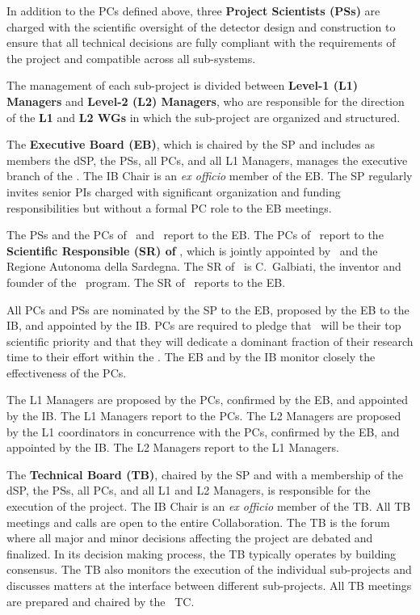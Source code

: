In addition to the PCs defined above, three {\bf Project Scientists (PSs)} are charged with the scientific oversight of the detector design and construction to ensure that all technical decisions are fully compliant with the requirements of the project and compatible across all sub-systems.

The management of each sub-project is divided between {\bf Level-1 (L1) Managers} and {\bf Level-2 (L2) Managers}, who are responsible for the direction of the {\bf L1} and {\bf L2 WGs} in which the sub-project are organized and structured.

The {\bf Executive Board (EB)}, which is chaired by the SP and includes as members the dSP, the PSs, all PCs, and all L1 Managers, manages the executive branch of the \GADMC.  The IB Chair is an {\it ex officio} member of the EB.  The SP regularly invites senior PIs charged with significant organization and funding responsibilities but without a formal PC role to the EB meetings.

The PSs and the PCs of \DSks\ and \Urania\ report to the EB.  The PCs of \Aria\ report to the {\bf Scientific Responsible (SR) of \Aria}, which is jointly appointed by \INFN\ and the Regione Autonoma della Sardegna.  The SR of \Aria\ is C.~Galbiati, the inventor and founder of the \Aria\ program.  The SR of \Aria\ reports to the EB.

All PCs and PSs are nominated by the SP to the EB, proposed by the EB to the IB, and appointed by the IB.  PCs are required to pledge that \DSks\ will be their top scientific priority and that they will dedicate a dominant fraction of their research time to their effort within the \GADMC.  The EB and by the IB monitor closely the effectiveness of the PCs.

The L1 Managers are proposed by the PCs, confirmed by the EB, and appointed by the IB.  The L1 Managers report to the PCs.  The L2 Managers are proposed by the L1 coordinators in concurrence with the PCs, confirmed by the EB, and appointed by the IB.  The L2 Managers report to the L1 Managers.

The {\bf Technical Board (TB)}, chaired by the SP and with a membership of the dSP, the PSs, all PCs, and all L1 and L2 Managers, is responsible for the execution of the project.  The IB Chair is an {\it ex officio} member of the TB.  All TB meetings and calls are open to the entire Collaboration.  The TB is the forum where all major and minor decisions affecting the project are debated and finalized.  In its decision making process, the TB typically operates by building consensus.  The TB also monitors the execution of the individual sub-projects and discusses matters at the interface between different sub-projects.  All TB meetings are prepared and chaired by the \DSks\ TC.

